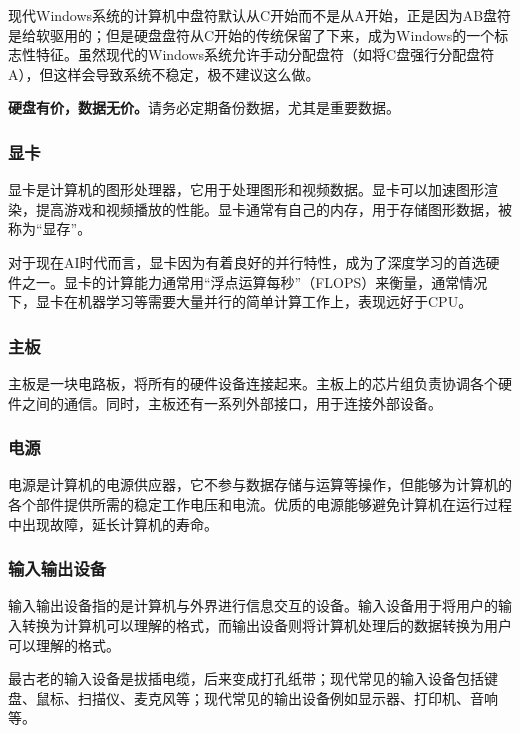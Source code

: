 \documentclass[../main.tex]{subfiles}
\begin{document}
\begin{note}
  现代Windows系统的计算机中盘符默认从C开始而不是从A开始，正是因为AB盘符是给软驱用的；但是硬盘盘符从C开始的传统保留了下来，成为Windows的一个标志性特征。虽然现代的Windows系统允许手动分配盘符（如将C盘强行分配盘符A），但这样会导致系统不稳定，极不建议这么做。
\end{note}

\begin{caution}
\textbf{硬盘有价，数据无价。}请务必定期备份数据，尤其是重要数据。
\end{caution}

\subsubsection{显卡}

显卡是计算机的图形处理器，它用于处理图形和视频数据。显卡可以加速图形渲染，提高游戏和视频播放的性能。显卡通常有自己的内存，用于存储图形数据，被称为“显存”。

对于现在AI时代而言，显卡因为有着良好的并行特性，成为了深度学习的首选硬件之一。显卡的计算能力通常用“浮点运算每秒”（FLOPS）来衡量，通常情况下，显卡在机器学习等需要大量并行的简单计算工作上，表现远好于CPU。

\subsubsection{主板}

主板是一块电路板，将所有的硬件设备连接起来。主板上的芯片组负责协调各个硬件之间的通信。同时，主板还有一系列外部接口，用于连接外部设备。

\subsubsection{电源}

电源是计算机的电源供应器，它不参与数据存储与运算等操作，但能够为计算机的各个部件提供所需的稳定工作电压和电流。优质的电源能够避免计算机在运行过程中出现故障，延长计算机的寿命。

\subsubsection{输入输出设备}

输入输出设备指的是计算机与外界进行信息交互的设备。输入设备用于将用户的输入转换为计算机可以理解的格式，而输出设备则将计算机处理后的数据转换为用户可以理解的格式。

最古老的输入设备是拔插电缆，后来变成打孔纸带；现代常见的输入设备包括键盘、鼠标、扫描仪、麦克风等；现代常见的输出设备例如显示器、打印机、音响等。
\end{document}
